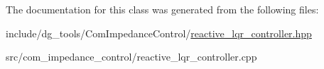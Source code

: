 The documentation for this class was generated from the following files\+:\begin{DoxyCompactItemize}
\item 
include/dg\+\_\+tools/\+Com\+Impedance\+Control/\hyperlink{reactive__lqr__controller_8hpp}{reactive\+\_\+lqr\+\_\+controller.\+hpp}\item 
src/com\+\_\+impedance\+\_\+control/reactive\+\_\+lqr\+\_\+controller.\+cpp\end{DoxyCompactItemize}
